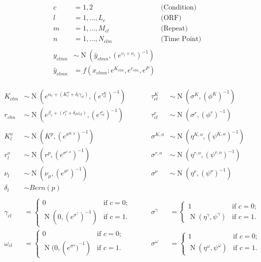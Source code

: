 \documentclass[11pt,a4paper]{article}
\begin{document}
\begin{align*}
c&=1,2 \qquad & \text{(Condition)}\\
l&=1,...,L_{c}  \qquad & \text{(ORF)}\\
m&=1,...,M_{cl}      \qquad & \text{(Repeat)}\\
n&=1,...,N_{clm}     \qquad & \text{(Time Point)}\\
\\
y_{clmn} &\sim \operatorname{N}(\hat{y}_{clmn},(e^{ \upsilon_{l}+\nu_{c}  })^{-1} ) \\
\hat{y}_{clmn} &= f(x_{clmn};e^{ K_{clm} } ,e^{ r_{clm} } , e^{ P })\\
\end{align*}

\begin{align*}
K_{clm} &\sim \operatorname{N}(e^{\alpha_{c}+(K_{l}^o+\delta_{l}\gamma_{cl})},(e^{ \tau_{cl}^K })^{-1})\qquad &\tau_{cl}^K &\sim \operatorname{N}(\sigma^{K}, (\phi^{K})^{-1} )\\
r_{clm} &\sim \operatorname{N}(e^{\beta_{c}+(r_{l}^o+\delta_{l}\omega_{cl})},(e^{ \tau_{cl}^r })^{-1})\qquad &\tau_{cl}^r &\sim \operatorname{N}(\sigma^{r}, (\phi^{r})^{-1} )\\
\\
K_{l}^o &\sim \operatorname{N}(K^p, (e^{ \sigma^{K,o} })^{-1} )\qquad &\sigma^{K,o} &\sim \operatorname{N}(\eta^{K,o}, (\psi^{K,o})^{-1} )\\
r_{l}^o &\sim \operatorname{N}(r^p, (e^{ \sigma^{r,o} })^{-1} )\qquad &\sigma^{r,o} &\sim \operatorname{N}(\eta^{r,o}, (\psi^{r,o})^{-1} )\\
\nu_{l} &\sim \operatorname{N}(\nu_{\mu},(e^{ \sigma^{\nu} })^{-1})\qquad&\sigma^{\nu} &\sim \operatorname{N}(\eta^{\nu}, (\psi^{\nu})^{-1} )\\
\delta_{l} &\sim Bern(p)\\
\\
\gamma_{cl}&=\begin{cases}
0  & \text{if } c=0;\\
\operatorname{N}(0,{(e^{\sigma^{\gamma}})}^{-1}) & \text{if } c=1.
\end{cases}
\qquad
&\sigma^{\gamma}&=\begin{cases}
1  & \text{if } c=0;\\
\operatorname{N}(\eta^{\gamma},\psi^{\gamma})  & \text{if } c=1.
\end{cases}
\\
\omega_{cl}&=\begin{cases}
0  & \text{if } c=0;\\
\operatorname{N}(0,({e^{\sigma^{\omega}})}^{-1}) & \text{if } c=1.
\end{cases}
\qquad
&\sigma^{\omega}&=\begin{cases}
1  & \text{if } c=0;\\
\operatorname{N}(\eta^{\omega},\psi^{\omega}) & \text{if } c=1.
\end{cases}
\end{align*}
\end{document}
